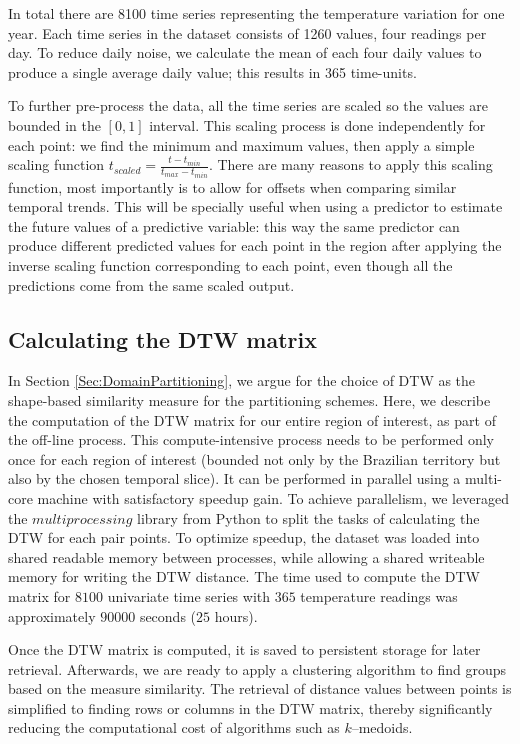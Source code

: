 In total there are 8100 time series representing the temperature variation for one year. Each time series in the dataset consists of 1260 values, four readings per day. To reduce daily noise, we calculate the mean of each four daily values to produce a single average daily value; this results in 365 time-units. 

To further pre-process the data, all the time series are scaled so the values are bounded in the $[0, 1]$ interval. This scaling process is done independently for each point: we find the minimum and maximum values, then apply a simple scaling function $ t_{scaled} = \frac{t - t_{min}}{t_{max} - t_{min}}$. There are many reasons to apply this scaling function, most importantly is to allow for offsets when comparing similar temporal trends. This will be specially useful when using a predictor to estimate the future values of a predictive variable: this way the same predictor can produce different predicted values for each point in the region after applying the inverse scaling function corresponding to each point, even though all the predictions come from the same scaled output.

\subsection{Calculating the DTW matrix}
\label{Sec:Calculating_DTW}

In Section \ref{Sec:DomainPartitioning}, we argue for the choice of DTW as the shape-based similarity measure for the partitioning schemes. Here, we describe the computation of the DTW matrix for our entire region of interest, as part of the off-line process. This compute-intensive process needs to be performed only once for each region of interest (bounded not only by the Brazilian territory but also by the chosen temporal slice). It can be performed in parallel using a multi-core machine with satisfactory speedup gain. To achieve parallelism, we leveraged the $multiprocessing$ library from Python to split the tasks of calculating the DTW for each pair points. To optimize speedup, the dataset was loaded into shared readable memory between processes, while allowing a shared writeable memory for writing the DTW distance. The time used to compute the DTW matrix for $8100$ univariate time series with $365$ temperature readings was approximately $90000$ seconds ($25$ hours).

Once the DTW matrix is computed, it is saved to persistent storage for later retrieval. Afterwards, we are ready to apply a clustering algorithm to find groups based on the measure similarity. The retrieval of distance values between points is simplified to finding rows or columns in the DTW matrix, thereby significantly reducing the computational cost of algorithms such as $k$--medoids.

